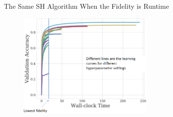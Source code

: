 
\begin{frame}{The Same SH Algorithm When the Fidelity is Runtime }

\vskip -10pt
\hskip 270pt
    
\begin{figure}
    \centering
    \includegraphics[width=0.6\textwidth]{../w07_hpo_speedup/images/hyperband/sh_accuracy_over_time.png}
\end{figure}
    
\end{frame}


%
%    
%    
%    
%    
%

